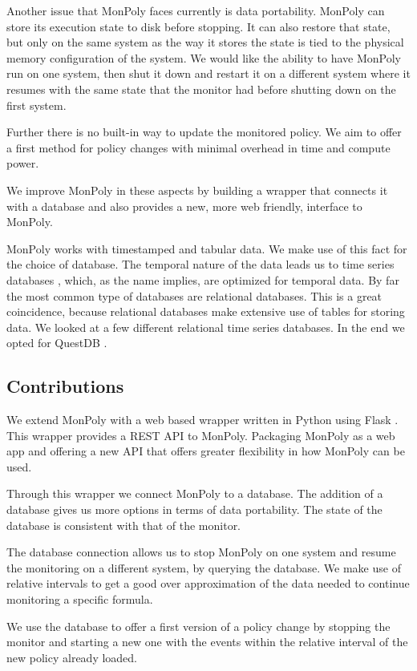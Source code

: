 Another issue that MonPoly faces currently is data portability.
MonPoly can store its execution state to disk before stopping.
It can also restore that state, but only on the same system as the way it stores the state is tied to the physical memory configuration of the system.
We would like the ability to have MonPoly run on one system, then shut it down and restart it on a different system where it resumes with the same state that the monitor had before shutting down on the first system.

Further there is no built-in way to update the monitored policy.
We aim to offer a first method for policy changes with minimal overhead in time and compute power.

We improve MonPoly in these aspects by building a wrapper that connects it with a database and also provides a new, more web friendly, interface to MonPoly.

MonPoly works with timestamped and tabular data.
We make use of this fact for the choice of database.
The temporal nature of the data leads us to time series databases \cite{}, which, as the name implies, are optimized for temporal data.
By far the most common type of databases are relational databases.
This is a great coincidence, because relational databases make extensive use of tables for storing data.
We looked at a few different relational time series databases.
In the end we opted for QuestDB \cite{questdb}.

\subsection{Contributions}
We extend MonPoly with a web based wrapper written in Python using Flask \cite{Flask}.
This wrapper provides a REST API \cite{Fielding2000} to MonPoly.
Packaging MonPoly as a web app and offering a new API that offers greater flexibility in how MonPoly can be used.

Through this wrapper we connect MonPoly to a database.
The addition of a database gives us more options in terms of data portability.
The state of the database is consistent with that of the monitor.

The database connection allows us to stop MonPoly on one system and resume the monitoring on a different system, by querying the database.
We make use of relative intervals \cite{Basin2017} to get a good over approximation of the data needed to continue monitoring a specific formula.

We use the database to offer a first version of a policy change by stopping the monitor and starting a new one with the events within the relative interval of the new policy already loaded.

